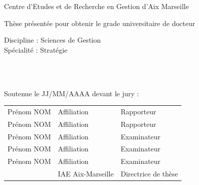 \begin{titlepage}
\begin{flushleft}
	\vspace{0.2cm}
	Centre d'Etudes et de Recherche en Gestion d'Aix Marseille\\
    \begin{center}
		\vspace{2cm}
	\normalsize	Thèse présentée pour obtenir le grade universitaire de docteur\\
    \end{center}
	\vspace{0.5cm}
    \normalsize Discipline : Sciences de Gestion\\
    \normalsize Spécialité : Stratégie\\
    \begin{center}
        \vspace{0.5cm}
        \Large \titrethese \\
        \vspace{1cm}
        \large \auteurthese \\
    \end{center}
	\vspace{2.5cm}
    \normalsize Soutenue le JJ/MM/AAAA devant le jury :\\
\end{flushleft}
\vspace{0.4cm}
\begin{tabular}{lll}
	Prénom NOM & Affiliation & Rapporteur \\
    \vspace{0.08cm}
	Prénom NOM & Affiliation & Rapporteur \\
    \vspace{0.08cm}
	Prénom NOM & Affiliation & Examinateur \\
    \vspace{0.08cm}
	Prénom NOM & Affiliation & Examinateur \\
    \vspace{0.08cm}
	Prénom NOM & Affiliation & Examinateur \\
    \vspace{0.08cm}
	\DR & IAE Aix-Marseille & Directrice de thèse \\
\end{tabular}
\selectfont{}


\end{titlepage}